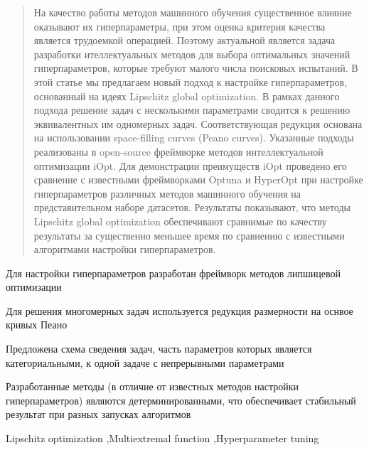 \documentclass[preprint,12pt]{elsarticle}
\begin{document}
\begin{frontmatter}
\begin{abstract}
На качество работы методов машинного обучения существенное влияние оказывают их гиперпараметры, при этом оценка критерия качества является трудоемкой операцией. Поэтому актуальной является задача разработки ителлектуальных методов для выбора оптимальных значений гиперпараметров, которые требуют малого числа поисковых испытаний.
В этой статье мы предлагаем новый подход к настройке гиперпараметров, основанный на идеях Lipschitz global optimization. 
В рамках данного подхода решение задач с несколькими параметрами сводится к решению эквивалентных им одномерных задач. Соответствующая редукция основана на использовании space-filling curves (Peano curves). 
Указанные подходы реализованы в open-source фреймворке методов интеллектуальной оптимизации iOpt.
Для демонстрации преимуществ iOpt проведено его сравнение с известными фреймворками Optuna и HyperOpt при настройке гиперпараметров различных методов машинного обучения на представительном наборе датасетов. Результаты показывают, что методы Lipschitz global optimization обеспечивают сравнимые по качеству результаты за существенно меньшее время по сравнению с известными алгоритмами настройки гиперпараметров.

\end{abstract}


\begin{highlights}
\item Для настройки гиперпараметров разработан фреймворк методов липшицевой оптимизации
\item Для решения многомерных задач используется редукция размерности на оснвое кривых Пеано
\item Предложена схема сведения задач, часть параметров которых является категориальными, к одной задаче с непрерывными параметрами 
\item Разработанные методы (в отличие от известных методов настройки гиперпараметров) являются детерминированными, что обеспечивает стабильный результат при разных запусках алгоритмов
\end{highlights}

\begin{keyword}
Lipschitz optimization \sep Multiextremal function \sep Hyperparameter tuning



\end{keyword}

\end{frontmatter}
\end{document}
